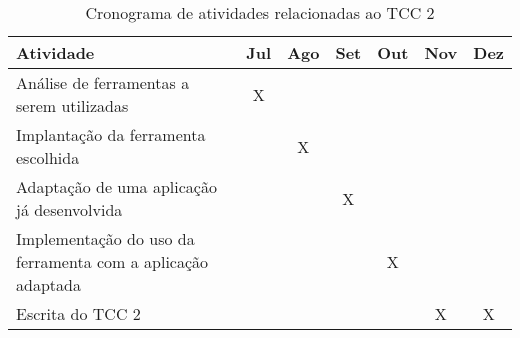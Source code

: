 \begin{table}[!h]
\centering
\caption{Cronograma de atividades relacionadas ao TCC 2}
\label{cronograma_tcc2}
\begin{tabular}{|l|c|c|c|c|c|c|}
\hline
Atividade                                                   & \multicolumn{1}{l|}{Jul} & \multicolumn{1}{l|}{Ago} & \multicolumn{1}{l|}{Set} & \multicolumn{1}{l|}{Out} & \multicolumn{1}{l|}{Nov} & \multicolumn{1}{l|}{Dez} \\ \hline
Análise de ferramentas a serem utilizadas                   & X                           &                             &                              &                            &                             &                              \\ \hline
Implantação da ferramenta escolhida                         &                             & X                            &                              &                            &                             &                              \\ \hline
Adaptação de uma aplicação já desenvolvida                  &                             &                               & X                            &                            &                             &                              \\ \hline
Implementação do uso da ferramenta com a aplicação adaptada &                             &                         &                              & X                          &                             &                              \\ \hline
Escrita do TCC 2                                            &                             &                             &                              &                            & X                           & X          \\ \hline
\end{tabular}
\end{table}